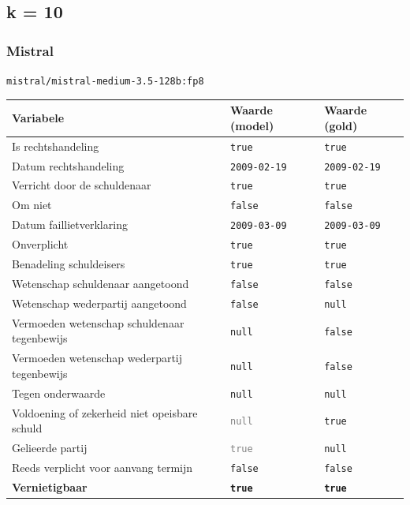 \documentclass[
  dutch,
  a4paper,
]{article}
\begin{document}
\newpage


\subsection{k = 10}\label{k-10-9}

\subsubsection{Mistral}\label{mistral-29}

\texttt{mistral/mistral-medium-3.5-128b:fp8}

\begin{center}
\small
\begin{tabular}{@{}p{7.4cm}p{2.6cm}p{2.6cm}@{}}
\toprule
Variabele & Waarde (model) & Waarde (gold) \\
\midrule
Is rechtshandeling & \texttt{true} & \texttt{true} \\
Datum rechtshandeling & \texttt{2009-02-19} & \texttt{2009-02-19} \\
Verricht door de schuldenaar & \texttt{true} & \texttt{true} \\
Om niet & \texttt{false} & \texttt{false} \\
Datum faillietverklaring & \texttt{2009-03-09} & \texttt{2009-03-09} \\
Onverplicht & \texttt{true} & \texttt{true} \\
Benadeling schuldeisers & \texttt{true} & \texttt{true} \\
Wetenschap schuldenaar aangetoond & \texttt{false} & \texttt{false} \\
Wetenschap wederpartij aangetoond & \texttt{false} & \texttt{null} \\
Vermoeden wetenschap schuldenaar tegenbewijs & \texttt{null} & \texttt{false} \\
Vermoeden wetenschap wederpartij tegenbewijs & \texttt{null} & \texttt{false} \\
Tegen onderwaarde & \texttt{null} & \texttt{null} \\
Voldoening of zekerheid niet opeisbare schuld & \textcolor{gray}{\texttt{null}} & \texttt{true} \\
Gelieerde partij & \textcolor{gray}{\texttt{true}} & \texttt{null} \\
Reeds verplicht voor aanvang termijn & \texttt{false} & \texttt{false} \\
\textbf{Vernietigbaar} & \textbf{\texttt{true}} & \textbf{\texttt{true}} \\
\bottomrule
\end{tabular}
\end{center}
\end{document}
